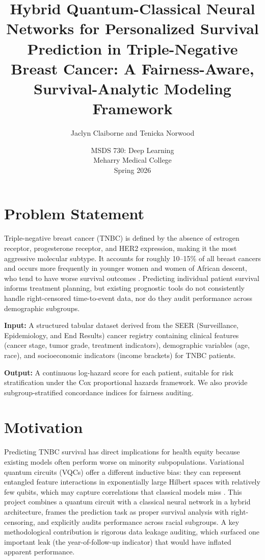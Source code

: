 \documentclass[12pt, letterpaper]{article}
\title{
    \textbf{Hybrid Quantum-Classical Neural Networks for Personalized Survival Prediction in Triple-Negative Breast Cancer: A Fairness-Aware, Survival-Analytic Modeling Framework}
}
\author{
    Jaclyn Claiborne and Tenicka Norwood
}
\date{MSDS 730: Deep Learning \\ Meharry Medical College \\ Spring 2026}
\begin{document}
\maketitle


\section{Problem Statement}

Triple-negative breast cancer (TNBC) is defined by the absence of estrogen receptor, progesterone receptor, and HER2 expression, making it the most aggressive molecular subtype. It accounts for roughly 10--15\% of all breast cancers and occurs more frequently in younger women and women of African descent, who tend to have worse survival outcomes \citep{sandarenu2022, qiu2024}. Predicting individual patient survival informs treatment planning, but existing prognostic tools do not consistently handle right-censored time-to-event data, nor do they audit performance across demographic subgroups.

\textbf{Input:} A structured tabular dataset derived from the SEER (Surveillance, Epidemiology, and End Results) cancer registry containing clinical features (cancer stage, tumor grade, treatment indicators), demographic variables (age, race), and socioeconomic indicators (income brackets) for TNBC patients.

\textbf{Output:} A continuous log-hazard score for each patient, suitable for risk stratification under the Cox proportional hazards framework. We also provide subgroup-stratified concordance indices for fairness auditing.


\section{Motivation}

Predicting TNBC survival has direct implications for health equity because existing models often perform worse on minority subpopulations. Variational quantum circuits (VQCs) offer a different inductive bias: they can represent entangled feature interactions in exponentially large Hilbert spaces with relatively few qubits, which may capture correlations that classical models miss \citep{schuld2021, mcclean2018}. This project combines a quantum circuit with a classical neural network in a hybrid architecture, frames the prediction task as proper survival analysis with right-censoring, and explicitly audits performance across racial subgroups. A key methodological contribution is rigorous data leakage auditing, which surfaced one important leak (the year-of-follow-up indicator) that would have inflated apparent performance.
\end{document}
